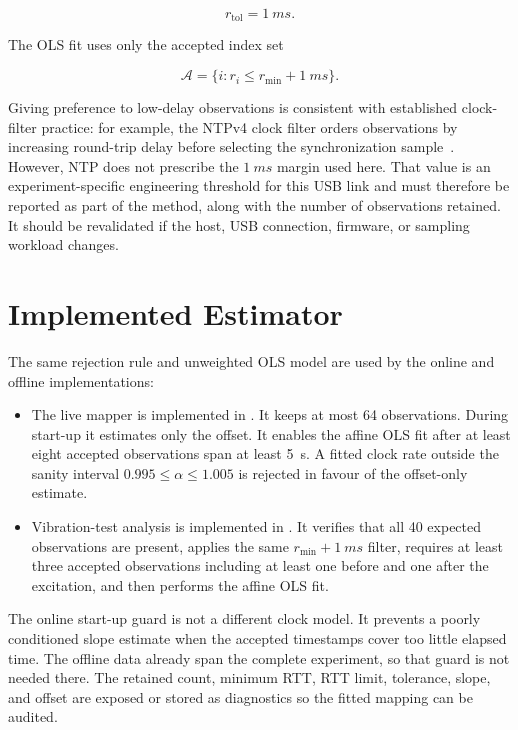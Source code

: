 \documentclass[11pt,a4paper]{article}
\begin{document}
\begin{equation}
    r_{\mathrm{tol}} = \SI{1}{ms}.
\end{equation}

The OLS fit uses only the accepted index set

\begin{equation}
    \mathcal{A} = \{i : r_i \leq r_{\min} + \SI{1}{ms}\}.
\end{equation}

Giving preference to low-delay observations is consistent with established
clock-filter practice: for example, the NTPv4 clock filter orders observations
by increasing round-trip delay before selecting the synchronization
sample~\cite[Sec.~10]{mills2010ntp}. However, NTP does not prescribe the
\(\SI{1}{ms}\) margin used here. That value is an experiment-specific engineering
threshold for this USB link and must therefore be reported as part of the method,
along with the number of observations retained. It should be revalidated if the
host, USB connection, firmware, or sampling workload changes.

\section{Implemented Estimator}

The same rejection rule and unweighted OLS model are used by the online and
offline implementations:

\begin{itemize}
    \item The live mapper is implemented in
    . It keeps at most 64
    observations. During start-up it estimates only the offset. It enables the
    affine OLS fit after at least eight accepted observations span at least
    \SI{5}{s}. A fitted clock rate outside the sanity interval
    \(0.995 \leq \alpha \leq 1.005\) is rejected in favour of the offset-only
    estimate.
    \item Vibration-test analysis is implemented in
    . It verifies that all 40 expected
    observations are present, applies the same \(r_{\min}+\SI{1}{ms}\) filter,
    requires at least three accepted observations including at least one before
    and one after the excitation, and then performs the affine OLS fit.
\end{itemize}

The online start-up guard is not a different clock model. It prevents a poorly
conditioned slope estimate when the accepted timestamps cover too little elapsed
time. The offline data already span the complete experiment, so that guard is not
needed there. The retained count, minimum RTT, RTT limit, tolerance, slope, and
offset are exposed or stored as diagnostics so the fitted mapping can be audited.
\end{document}
